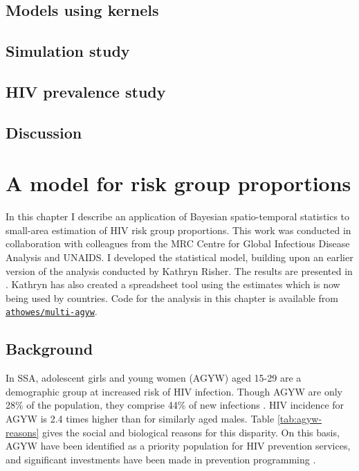 \documentclass[a4paper, nobind]{templates/ociamthesis}
\begin{document}
\hypertarget{models-using-kernels}{%
\section{Models using kernels}\label{models-using-kernels}}

\hypertarget{simulation-study}{%
\section{Simulation study}\label{simulation-study}}

\hypertarget{hiv-prevalence-study}{%
\section{HIV prevalence study}\label{hiv-prevalence-study}}

\hypertarget{discussion}{%
\section{Discussion}\label{discussion}}

\hypertarget{multi-agyw}{%
\chapter{A model for risk group proportions}\label{multi-agyw}}

\adjustmtc
{}

In this chapter I describe an application of Bayesian spatio-temporal statistics to small-area estimation of HIV risk group proportions.
This work was conducted in collaboration with colleagues from the MRC Centre for Global Infectious Disease Analysis and UNAIDS.
I developed the statistical model, building upon an earlier version of the analysis conducted by Kathryn Risher.
The results are presented in \textcite{howes2023spatio}.
Kathryn has also created a spreadsheet tool using the estimates which is now being used by countries.
Code for the analysis in this chapter is available from \href{https://github.com/athowes/multi-agyw}{\texttt{athowes/multi-agyw}}.

\hypertarget{background-2}{%
\section{Background}\label{background-2}}

In SSA, adolescent girls and young women (AGYW) aged 15-29 are a demographic group at increased risk of HIV infection.
Though AGYW are only 28\% of the population, they comprise 44\% of new infections \autocite{unaids2021update}.
HIV incidence for AGYW is 2.4 times higher than for similarly aged males.
Table \ref{tab:agyw-reasons} gives the social and biological reasons for this disparity.
On this basis, AGYW have been identified as a priority population for HIV prevention services, and significant investments have been made in prevention programming \autocite{saul2018dreams,global2018measurement}.
\end{document}
